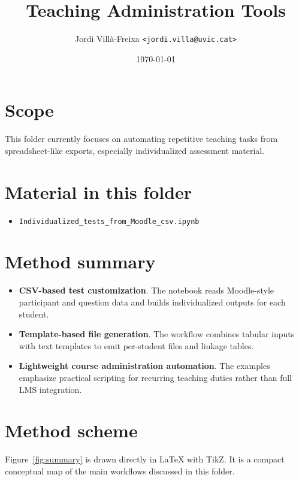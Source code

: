 \documentclass[11pt,a4paper]{article}
\title{Teaching Administration Tools}
\author{Jordi Vill\`a-Freixa \texttt{<jordi.villa@uvic.cat>}}
\date{\today}
\begin{document}
    \maketitle

    \section*{Scope}
    This folder currently focuses on automating repetitive teaching tasks from spreadsheet-like exports, especially individualized assessment material.

    \section*{Material in this folder}
    \begin{itemize}[leftmargin=*]
\item \texttt{Individualized\_tests\_from\_Moodle\_csv.ipynb}
    \end{itemize}

    \section*{Method summary}
    \begin{itemize}[leftmargin=*]
\item \textbf{CSV-based test customization}. The notebook reads Moodle-style participant and question data and builds individualized outputs for each student.
\item \textbf{Template-based file generation}. The workflow combines tabular inputs with text templates to emit per-student files and linkage tables.
\item \textbf{Lightweight course administration automation}. The examples emphasize practical scripting for recurring teaching duties rather than full LMS integration.
    \end{itemize}

    \section*{Method scheme}
    Figure~\ref{fig:summary} is drawn directly in LaTeX with TikZ. It is a compact conceptual map of the main workflows discussed in this folder.
\end{document}
